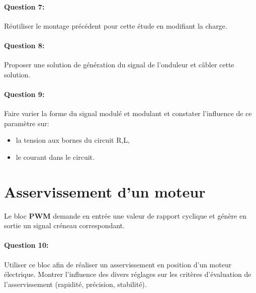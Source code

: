 \paragraph{Question 7:} Réutiliser le montage précédent pour cette étude en modifiant la charge.

\paragraph{Question 8:} Proposer une solution de génération du signal de l'onduleur et câbler cette solution.

\paragraph{Question 9:} Faire varier la forme du signal modulé et modulant et constater l'influence de ce paramètre sur:
\begin{itemize}
 \item la tension aux bornes du circuit R,L,
 \item le courant dans le circuit.
\end{itemize}

\section{Asservissement d'un moteur}

Le bloc \textbf{PWM} demande en entrée une valeur de rapport cyclique et génère en sortie un signal créneau correspondant.

\paragraph{Question 10:} Utiliser ce bloc afin de réaliser un asservissement en position d'un moteur électrique. Montrer l'influence des divers réglages sur les critères d'évaluation de l'asservissement (rapidité, précision, stabilité).


